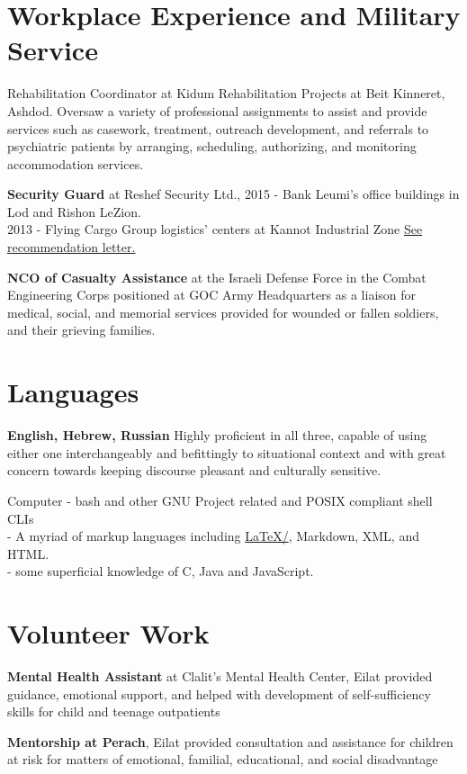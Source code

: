 \section{Workplace Experience and Military Service}

{Rehabilitation Coordinator at Kidum Rehabilitation Projects at Beit Kinneret, Ashdod.}
{Oversaw a variety of professional assignments to assist and provide services such as casework, treatment, outreach development, and referrals to psychiatric patients by arranging, scheduling, authorizing, and monitoring accommodation services.}
{}

{\textbf{Security Guard} at Reshef Security Ltd.,} 
{2015 - Bank Leumi's office buildings in Lod and Rishon LeZion. \\
2013 - Flying Cargo Group logistics' centers at Kannot Industrial Zone}
{\href{https://www.dropbox.com/s/kr5rcui1zgp35i0/recommendation-letter-security-guard.jpg?dl=0}{See recommendation letter.}}

{\textbf{NCO of Casualty Assistance} at the Israeli Defense Force in the Combat Engineering Corps} 
{positioned at GOC Army Headquarters as a liaison for medical, social, and memorial services provided for wounded or fallen soldiers, and their grieving families.}
{}

\section{Languages}

{\textbf{English, Hebrew, Russian}}
{Highly proficient in all three, capable of using either one interchangeably and befittingly to situational context and with great concern towards keeping discourse pleasant and culturally sensitive.}
{}

{Computer}
{- bash and other GNU Project related and POSIX compliant shell CLIs \\
- A myriad of markup languages including \href{https://github.com/kiril-u/cv/blob/main/cv-a/main.tex}{\LaTeX/\XeTeX}, Markdown, XML, and HTML. \\
- some superficial knowledge of C, Java and JavaScript.} \\
{}
\section{Volunteer Work}


{\textbf{Mental Health Assistant} at Clalit's Mental Health Center, Eilat}
{provided guidance, emotional support, and helped with development of self-sufficiency skills for child and teenage outpatients}
{}

{\textbf{Mentorship at Perach}, Eilat}
{provided consultation and assistance for children at risk for matters of emotional, familial, educational, and social disadvantage}
{} 
\unsetLTR
